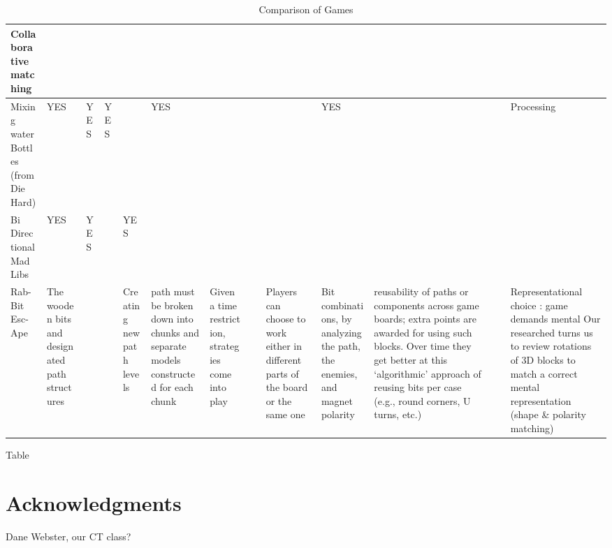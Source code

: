 \documentclass{acm_proc_article-sp}
\begin{document}
\begin{sidewaystable}[htbp]
\begin{tabular}{|p{1.3cm}||p{1cm}|p{2cm}|p{2cm}|p{1.6cm}|p{2cm}|p{1cm}|p{2cm}|p{1cm}|p{1.3cm}|p{2.7cm}|p{1cm}|p{1.6cm}|}
    Collaborative matching & ~ & ~ & ~ & ~ & ~ & ~ & ~ & ~ & ~ & ~ & ~ & ~ \\ \hline
    
    Mixing water Bottles (from Die Hard\cite{diehard2008thorp}) & \cellcolor{blue!25}YES & \cellcolor{blue!25}YES & \cellcolor{blue!25}YES & ~ & \cellcolor{blue!25}YES & ~ & ~ & ~ & \cellcolor{blue!25}YES & ~ & ~ & Processing \\ \hline
    
    Bi Directional Mad Libs & \cellcolor{blue!25}YES & \cellcolor{blue!25}YES & ~ & \cellcolor{blue!25}YES & ~ & ~ & ~ & ~ & ~ & ~ & ~ & ~ \\ \hline
    
    Rab-Bit Esc-Ape & The wooden bits and designated path structures & ~ & ~ & Creating new path levels & path must be broken down into chunks and separate models constructed for each chunk & Given a time restriction, strategies come into play & ~ & Players can choose to work either in different parts of the board or the same one & Bit combinations, by analyzing the path, the enemies, and magnet polarity & reusability of paths or components across game boards; extra points are awarded for using such blocks. Over time they get better at this `algorithmic' approach of reusing bits per case (e.g., round corners, U turns, etc.) & ~ & Representational choice : game demands mental
    Our researched turns us to review  rotations of 3D blocks to match a correct mental representation (shape \& polarity matching) \\ \hline
    \end{tabular}\hspace*{-1cm}\vspace*{-1cm}
    \caption{Comparison of Games}
    Table \label{table:games-comparison}
\end{sidewaystable}

\clearpage
\section{Acknowledgments}
Dane Webster, our CT class?
\end{document}
